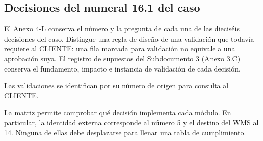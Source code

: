 \subsection{Decisiones del numeral 16.1 del caso}
\label{sec:16-decisiones-caso}

El Anexo 4-L conserva el número y la pregunta de cada una de las dieciséis decisiones del caso. Distingue una regla de diseño de una validación que todavía requiere al CLIENTE: una fila marcada para validación no equivale a una aprobación suya. El registro de supuestos del Subdocumento 3 (Anexo 3.C) conserva el fundamento, impacto e instancia de validación de cada decisión.


Las validaciones se identifican por su número de origen para consulta al CLIENTE.

La matriz permite comprobar qué decisión implementa cada módulo. En particular, la identidad externa corresponde al número 5 y el destino del WMS al 14. Ninguna de ellas debe desplazarse para llenar una tabla de cumplimiento.

